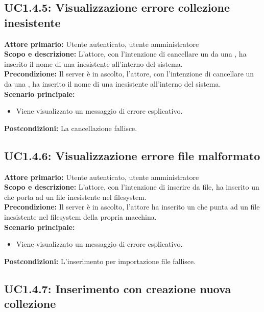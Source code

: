 \documentclass{scalatekids-article}
\begin{document}
\subsection{UC1.4.5: Visualizzazione errore collezione inesistente}

\textbf{Attore primario:} Utente autenticato, utente amministratore\\
\textbf{Scopo e descrizione:} L'attore, con l'intenzione di cancellare un  da una , ha inserito il nome di una  inesistente
all'interno del sistema.\\
\textbf{Precondizione:} Il server è in ascolto, l'attore, con l'intenzione di cancellare un  da una , ha inserito il nome di una  inesistente
all'interno del sistema.\\
\textbf{Scenario principale:}
\begin{itemize}
\item Viene visualizzato un messaggio di errore esplicativo.
\end{itemize}
\textbf{Postcondizioni:} La cancellazione  fallisce.

\subsection{UC1.4.6: Visualizzazione errore file malformato}

\textbf{Attore primario:} Utente autenticato, utente amministratore\\
\textbf{Scopo e descrizione:} L'attore, con l'intenzione di inserire  da file, ha inserito un  che porta ad un file inesistente nel filesystem.\\
\textbf{Precondizione:} Il server è in ascolto, l'attore ha inserito un  che punta ad un file inesistente nel filesystem della propria macchina.\\
\textbf{Scenario principale:}
\begin{itemize}
\item Viene visualizzato un messaggio di errore esplicativo.
\end{itemize}
\textbf{Postcondizioni:} L'inserimento per importazione file fallisce.

\subsection{UC1.4.7: Inserimento con creazione nuova collezione}
\end{document}
